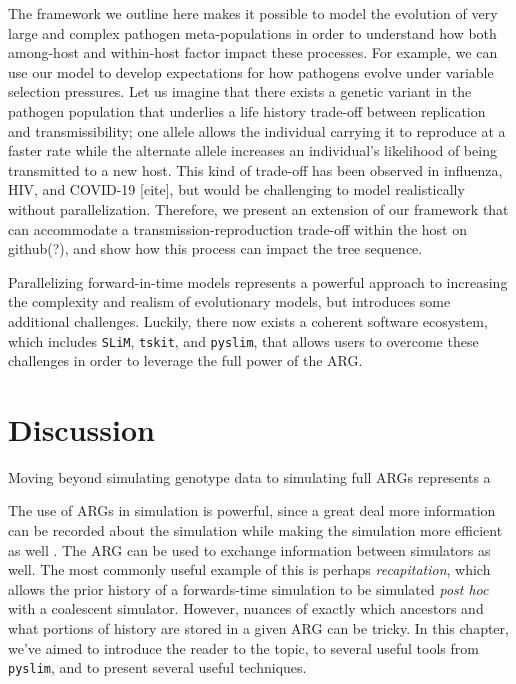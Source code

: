 \documentclass[12pt]{article}
\newcommand{\tskit}[0]{\texttt{tskit}\xspace}
\newcommand{\slim}[0]{\texttt{SLiM}\xspace}
\newcommand{\pyslim}[0]{\texttt{pyslim}\xspace}
\begin{document}

The framework we outline here makes it possible to model the evolution of very large and complex pathogen meta-populations in order to understand how both among-host
and within-host factor impact these processes. For example, we can use our model to develop expectations for how pathogens evolve under variable selection pressures. Let
us imagine that there exists a genetic variant in the pathogen population that underlies a life history trade-off between replication and transmissibility; one allele allows the
individual carrying it to reproduce at a faster rate while the alternate allele increases an individual's likelihood of being transmitted to a new host. This kind of trade-off has been
observed in influenza, HIV, and COVID-19 [cite], but would be challenging to model realistically without parallelization. Therefore, we present an extension of our framework
that can accommodate a transmission-reproduction trade-off within the host on github(?), and show how this process can impact the tree sequence.

Parallelizing forward-in-time models represents a powerful approach to increasing the complexity and realism of evolutionary models, but introduces some additional challenges.
Luckily, there now exists a coherent software ecosystem, which includes \slim, \tskit, and \pyslim, that allows users to overcome these challenges in order to leverage the full
power of the ARG.

\section*{Discussion}

Moving beyond simulating genotype data to simulating full ARGs represents a 

The use of ARGs in simulation is powerful,
since a great deal more information can be recorded about the simulation
while making the simulation more efficient as well \citep{kelleher2016efficient}.
The ARG can be used to exchange information between simulators as well.
The most commonly useful example of this is perhaps \emph{recapitation},
which allows the prior history of a forwards-time simulation
to be simulated \emph{post hoc} with a coalescent simulator.
However, nuances of exactly which ancestors and what portions of history
are stored in a given ARG can be tricky.
In this chapter, we've aimed to introduce the reader to the topic,
to several useful tools from \pyslim,
and to present several useful techniques.
\end{document}
